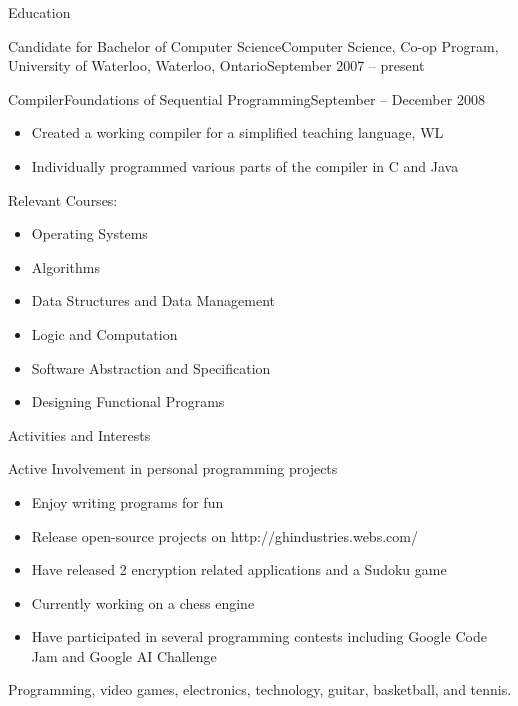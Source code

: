 \documentclass[11pt]{article}
\begin{document}
\begin{section}{Education}
\begin{subsection}{Candidate for Bachelor of Computer Science}{Computer Science, Co-op Program, University of Waterloo, Waterloo, Ontario}{September 2007 -- present}
\begin{indent}
\begin{subsection}{Compiler}{Foundations of Sequential Programming}{September -- December 2008}
					\begin{itemize}
						\item Created a working compiler for a simplified teaching language, WL
						\item Individually programmed various parts of the compiler in C and Java
					\end{itemize}
				
				\end{subsection}
				
				\begin{bf}Relevant Courses:\end{bf}
				
				\begin{itemize}
                    \item Operating Systems
                    \item Algorithms
					\item Data Structures and Data Management
					\item Logic and Computation
					\item Software Abstraction and Specification
					\item Designing Functional Programs
				\end{itemize}
			\end{indent}
			
		\end{subsection}
			
	\end{section}
	
	\begin{section}{Activities and Interests} \\
	
		\begin{bf}Active Involvement in personal programming projects\end{bf}
		
		\begin{itemize}
			\item Enjoy writing programs for fun
			\item Release open-source projects on http://ghindustries.webs.com/
			\item Have released 2 encryption related applications and a Sudoku game
            \item Currently working on a chess engine
            \item Have participated in several programming contests including Google Code Jam and Google AI Challenge
		\end{itemize}
		
		Programming, video games, electronics, technology, guitar, basketball, and tennis.
		
	\end{section}
\end{document}
